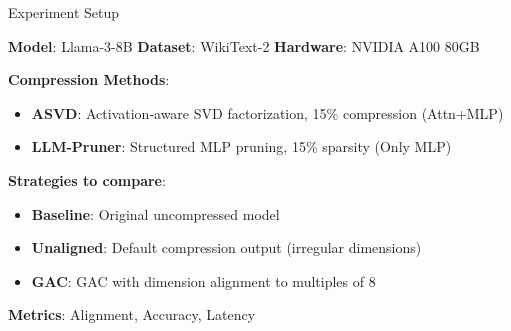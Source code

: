 \documentclass[aspectratio=169,10pt]{beamer}
\begin{document}
\begin{frame}{Experiment Setup}

\textbf{Model}: Llama-3-8B \quad\textbf{Dataset}: WikiText-2 \quad\textbf{Hardware}: NVIDIA A100 80GB

\vspace{0.3cm}
\textbf{Compression Methods}:
\begin{itemize}\setlength\itemsep{0.15em}
\item \textbf{ASVD}: Activation-aware SVD factorization, 15\% compression (Attn+MLP)
\item \textbf{LLM-Pruner}: Structured MLP pruning, 15\% sparsity (Only MLP)
\end{itemize}

\vspace{0.3cm}
\textbf{Strategies to compare}:
\begin{itemize}\setlength\itemsep{0.15em}
\item \textbf{Baseline}: Original uncompressed model
\item \textbf{Unaligned}: Default compression output (irregular dimensions)
\item \textbf{GAC}: GAC with dimension alignment to multiples of 8
\end{itemize}

\vspace{0.3cm}
\textbf{Metrics}: Alignment, Accuracy, Latency
\end{frame}
\end{document}
